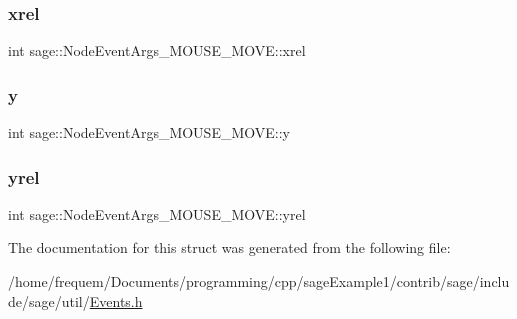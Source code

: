 \subsubsection{\texorpdfstring{xrel}{xrel}}
{\footnotesize\ttfamily int sage\+::\+Node\+Event\+Args\+\_\+\+M\+O\+U\+S\+E\+\_\+\+M\+O\+V\+E\+::xrel}

\mbox{\label{structsage_1_1NodeEventArgs__MOUSE__MOVE_a5af30db299bd9913605188f2d2c818b1}} 
\subsubsection{\texorpdfstring{y}{y}}
{\footnotesize\ttfamily int sage\+::\+Node\+Event\+Args\+\_\+\+M\+O\+U\+S\+E\+\_\+\+M\+O\+V\+E\+::y}

\mbox{\label{structsage_1_1NodeEventArgs__MOUSE__MOVE_a9617be59ee2a310a137406ee7be8b783}} 
\subsubsection{\texorpdfstring{yrel}{yrel}}
{\footnotesize\ttfamily int sage\+::\+Node\+Event\+Args\+\_\+\+M\+O\+U\+S\+E\+\_\+\+M\+O\+V\+E\+::yrel}



The documentation for this struct was generated from the following file\+:\begin{DoxyCompactItemize}
\item 
/home/frequem/\+Documents/programming/cpp/sage\+Example1/contrib/sage/include/sage/util/\mbox{\hyperlink{Events_8h}{Events.\+h}}\end{DoxyCompactItemize}
